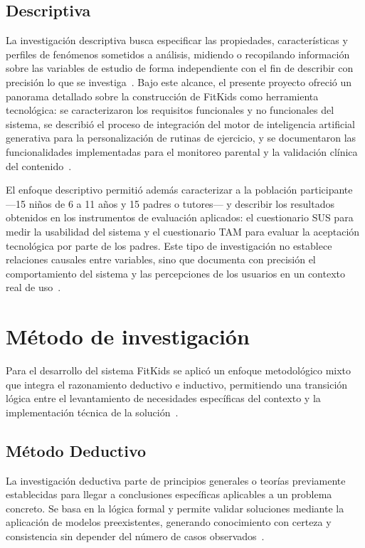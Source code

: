 			\subsection{Descriptiva}
				La investigación descriptiva busca especificar las propiedades, características y perfiles de fenómenos sometidos a análisis, midiendo o recopilando información sobre las variables de estudio de forma independiente con el fin de describir con precisión lo que se investiga~\cite{HernandezSampieri2014}. Bajo este alcance, el presente proyecto ofreció un panorama detallado sobre la construcción de FitKids como herramienta tecnológica: se caracterizaron los requisitos funcionales y no funcionales del sistema, se describió el proceso de integración del motor de inteligencia artificial generativa para la personalización de rutinas de ejercicio, y se documentaron las funcionalidades implementadas para el monitoreo parental y la validación clínica del contenido~\cite{GuerreroUlloa2024}.
				
				El enfoque descriptivo permitió además caracterizar a la población participante ---15 niños de 6 a 11 años y 15 padres o tutores--- y describir los resultados obtenidos en los instrumentos de evaluación aplicados: el cuestionario SUS para medir la usabilidad del sistema y el cuestionario TAM para evaluar la aceptación tecnológica por parte de los padres. Este tipo de investigación no establece relaciones causales entre variables, sino que documenta con precisión el comportamiento del sistema y las percepciones de los usuarios en un contexto real de uso~\cite{HernandezSampieri2014}.
		
		\section{Método de investigación}
			Para el desarrollo del sistema FitKids se aplicó un enfoque metodológico mixto que integra el razonamiento deductivo e inductivo, permitiendo una transición lógica entre el levantamiento de necesidades específicas del contexto y la implementación técnica de la solución~\cite{Creswell2018}.
			
			\subsection{Método Deductivo}
				La investigación deductiva parte de principios generales o teorías previamente establecidas para llegar a conclusiones específicas aplicables a un problema concreto. Se basa en la lógica formal y permite validar soluciones mediante la aplicación de modelos preexistentes, generando conocimiento con certeza y consistencia sin depender del número de casos observados~\cite{HernandezSampieri2014}.
				
